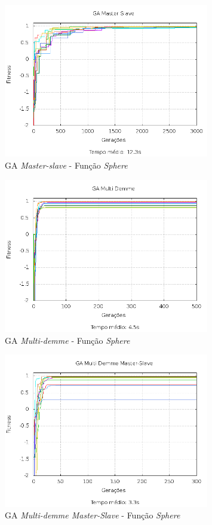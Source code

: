 \documentclass[12pt]{article}
\begin{document}
\begin{figure}[hp]
  \centering
  \includegraphics[width=0.8\textwidth]{ms_f1.png}
  \caption{GA \emph{Master-slave} - Função \emph{Sphere}}
\end{figure}

\begin{figure}[hp]
  \centering
  \includegraphics[width=0.8\textwidth]{md_f1.png}
  \caption{GA \emph{Multi-demme} - Função \emph{Sphere}}
\end{figure}

\begin{figure}[hp]
  \centering
  \includegraphics[width=0.8\textwidth]{msmd_f1.png}
  \caption{GA \emph{Multi-demme Master-Slave} - Função \emph{Sphere}}
\end{figure}
\end{document}

